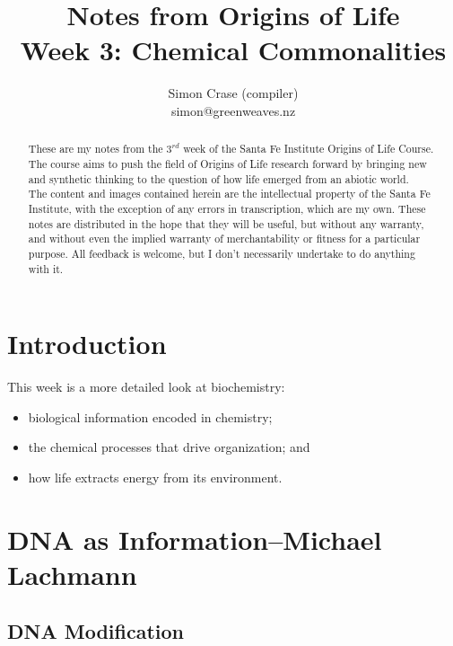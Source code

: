 \documentclass[]{article}
\title{
	Notes from Origins of Life\\
	Week 3: Chemical Commonalities
}
\author{Simon Crase (compiler)\\simon@greenweaves.nz}
\begin{document}
\maketitle

\begin{abstract}
 	These are my notes from the $3^{rd}$ week of the Santa Fe Institute Origins of Life Course\cite{sfi2020}. The course aims to push the field of Origins of Life research forward by bringing new and synthetic thinking to the question of how life emerged from an abiotic world.\\
  	The content and images contained herein are the intellectual property of the Santa Fe Institute, with the exception of any errors in transcription, which are my own.
  	These notes are distributed in the hope that they will be useful,
  	but without any warranty, and without even the implied warranty of
  	merchantability or fitness for a particular purpose. All feedback is welcome,
  	but I don't necessarily undertake to do anything with it.
\end{abstract}

\setcounter{tocdepth}{2}
\tableofcontents

\listoffigures
\listoftables

\section{Introduction}

This week is a more detailed look at biochemistry:\begin{itemize}
	\item  biological information encoded in chemistry;
	\item the chemical processes that drive organization; and
	\item  how life extracts energy from its environment.
\end{itemize}

\section[DNA as Information]{DNA as Information--Michael Lachmann}

\subsection{DNA Modification}
\end{document}
